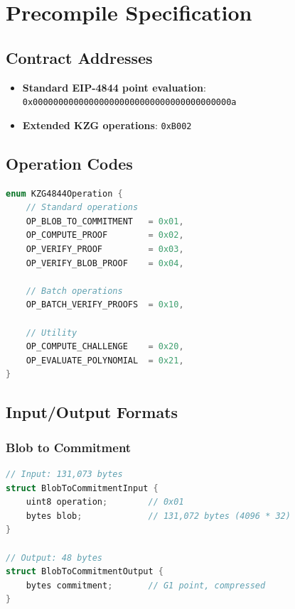 \documentclass[11pt,a4paper]{article}
\theoremstyle{definition}
\begin{document}
\section{Precompile Specification}

\subsection{Contract Addresses}

\begin{itemize}
    \item \textbf{Standard EIP-4844 point evaluation}: \texttt{0x000000000000000000000000000000000000000a}
    \item \textbf{Extended KZG operations}: \texttt{0xB002}
\end{itemize}

\subsection{Operation Codes}

\begin{lstlisting}[language=C]
enum KZG4844Operation {
    // Standard operations
    OP_BLOB_TO_COMMITMENT   = 0x01,
    OP_COMPUTE_PROOF        = 0x02,
    OP_VERIFY_PROOF         = 0x03,
    OP_VERIFY_BLOB_PROOF    = 0x04,

    // Batch operations
    OP_BATCH_VERIFY_PROOFS  = 0x10,

    // Utility
    OP_COMPUTE_CHALLENGE    = 0x20,
    OP_EVALUATE_POLYNOMIAL  = 0x21,
}
\end{lstlisting}

\subsection{Input/Output Formats}

\subsubsection{Blob to Commitment}

\begin{lstlisting}[language=C]
// Input: 131,073 bytes
struct BlobToCommitmentInput {
    uint8 operation;        // 0x01
    bytes blob;             // 131,072 bytes (4096 * 32)
}

// Output: 48 bytes
struct BlobToCommitmentOutput {
    bytes commitment;       // G1 point, compressed
}
\end{lstlisting}
\end{document}
